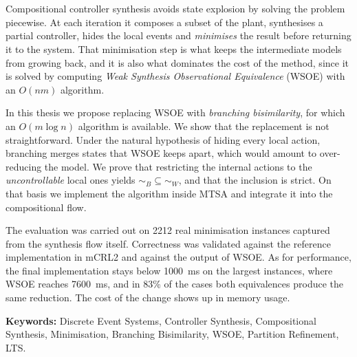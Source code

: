 \chapter*{\runtitle}

\noindent Compositional controller synthesis avoids state explosion by solving the problem piecewise. At each iteration it composes a subset of the plant, synthesises a partial controller, hides the local events and \textit{minimises} the result before returning it to the system. That minimisation step is what keeps the intermediate models from growing back, and it is also what dominates the cost of the method, since it is solved by computing \textit{Weak Synthesis Observational Equivalence} (WSOE) with an $O(nm)$ algorithm.

\noindent In this thesis we propose replacing WSOE with \textit{branching bisimilarity}, for which an $O(m \log n)$ algorithm is available. We show that the replacement is not straightforward. Under the natural hypothesis of hiding every local action, branching merges states that WSOE keeps apart, which would amount to over-reducing the model. We prove that restricting the internal actions to the \textit{uncontrollable} local ones yields $\sim_{B} \subseteq \sim_{W}$, and that the inclusion is strict. On that basis we implement the algorithm inside MTSA and integrate it into the compositional flow.

\noindent The evaluation was carried out on 2212 real minimisation instances captured from the synthesis flow itself. Correctness was validated against the reference implementation in mCRL2 and against the output of WSOE. As for performance, the final implementation stays below 1000~ms on the largest instances, where WSOE reaches 7600~ms, and in 83\% of the cases both equivalences produce the same reduction. The cost of the change shows up in memory usage.

\bigskip

\noindent\textbf{Keywords:} Discrete Event Systems, Controller Synthesis, Compositional Synthesis, Minimisation, Branching Bisimilarity, WSOE, Partition Refinement, LTS.
